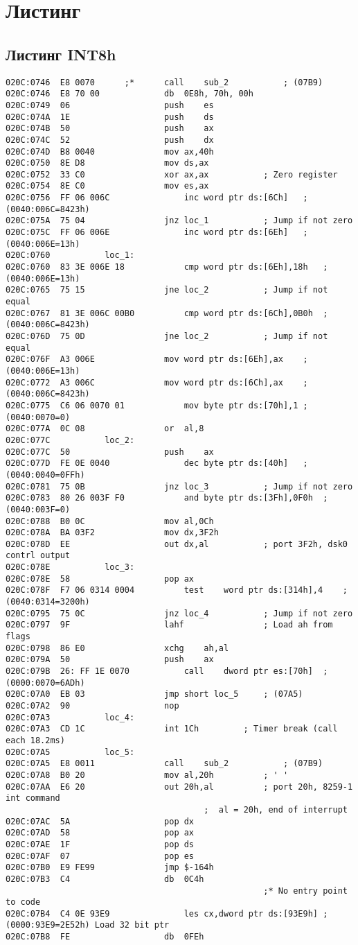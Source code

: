 \section*{Листинг}
\subsection*{Листинг INT8h} 
\begin{lstlisting}[style={asm}]
020C:0746  E8 0070		;*		call	sub_2			; (07B9)
020C:0746  E8 70 00				db	0E8h, 70h, 00h
020C:0749  06					push	es
020C:074A  1E					push	ds
020C:074B  50					push	ax
020C:074C  52					push	dx
020C:074D  B8 0040				mov	ax,40h
020C:0750  8E D8				mov	ds,ax
020C:0752  33 C0				xor	ax,ax			; Zero register
020C:0754  8E C0				mov	es,ax
020C:0756  FF 06 006C				inc	word ptr ds:[6Ch]	; (0040:006C=8423h)
020C:075A  75 04				jnz	loc_1			; Jump if not zero
020C:075C  FF 06 006E				inc	word ptr ds:[6Eh]	; (0040:006E=13h)
020C:0760			loc_1:
020C:0760  83 3E 006E 18			cmp	word ptr ds:[6Eh],18h	; (0040:006E=13h)
020C:0765  75 15				jne	loc_2			; Jump if not equal
020C:0767  81 3E 006C 00B0			cmp	word ptr ds:[6Ch],0B0h	; (0040:006C=8423h)
020C:076D  75 0D				jne	loc_2			; Jump if not equal
020C:076F  A3 006E				mov	word ptr ds:[6Eh],ax	; (0040:006E=13h)
020C:0772  A3 006C				mov	word ptr ds:[6Ch],ax	; (0040:006C=8423h)
020C:0775  C6 06 0070 01			mov	byte ptr ds:[70h],1	; (0040:0070=0)
020C:077A  0C 08				or	al,8
020C:077C			loc_2:
020C:077C  50					push	ax
020C:077D  FE 0E 0040				dec	byte ptr ds:[40h]	; (0040:0040=0FFh)
020C:0781  75 0B				jnz	loc_3			; Jump if not zero
020C:0783  80 26 003F F0			and	byte ptr ds:[3Fh],0F0h	; (0040:003F=0)
020C:0788  B0 0C				mov	al,0Ch
020C:078A  BA 03F2				mov	dx,3F2h
020C:078D  EE					out	dx,al			; port 3F2h, dsk0 contrl output
020C:078E			loc_3:
020C:078E  58					pop	ax
020C:078F  F7 06 0314 0004			test	word ptr ds:[314h],4	; (0040:0314=3200h)
020C:0795  75 0C				jnz	loc_4			; Jump if not zero
020C:0797  9F					lahf				; Load ah from flags
020C:0798  86 E0				xchg	ah,al
020C:079A  50					push	ax
020C:079B  26: FF 1E 0070			call	dword ptr es:[70h]	; (0000:0070=6ADh)
020C:07A0  EB 03				jmp	short loc_5		; (07A5)
020C:07A2  90					nop
020C:07A3			loc_4:
020C:07A3  CD 1C				int	1Ch			; Timer break (call each 18.2ms)
020C:07A5			loc_5:
020C:07A5  E8 0011				call	sub_2			; (07B9)
020C:07A8  B0 20				mov	al,20h			; ' '
020C:07AA  E6 20				out	20h,al			; port 20h, 8259-1 int command
										;  al = 20h, end of interrupt
020C:07AC  5A					pop	dx
020C:07AD  58					pop	ax
020C:07AE  1F					pop	ds
020C:07AF  07					pop	es
020C:07B0  E9 FE99				jmp	$-164h
020C:07B3  C4					db	0C4h
							                        ;* No entry point to code
020C:07B4  C4 0E 93E9				les	cx,dword ptr ds:[93E9h]	; (0000:93E9=2E52h) Load 32 bit ptr
020C:07B8  FE					db	0FEh
\end{lstlisting}
\newpage

